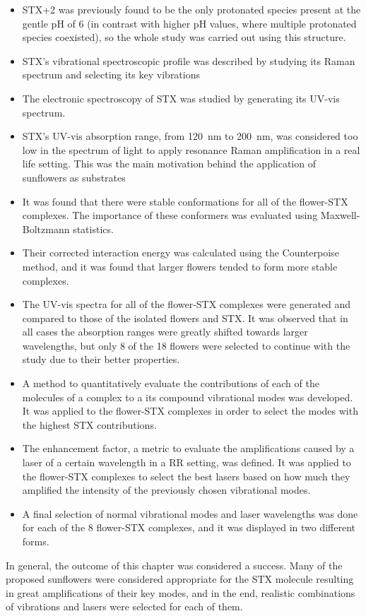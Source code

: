 \begin{itemize}
    \item STX+2 was previously found to be the only protonated species present at the gentle pH of 6 (in contrast with higher pH values, where multiple protonated species coexisted), so the whole study was carried out using this structure.
    \item STX's vibrational spectroscopic profile was described by studying its Raman spectrum and selecting its key vibrations
    \item The electronic spectroscopy of STX was studied by generating its UV-vis spectrum.
    \item STX's UV-vis absorption range, from \SI{120}{\nano\metre} to \SI{200}{\nano\metre}, was considered too low in the spectrum of light to apply resonance Raman amplification in a real life setting. This was the main motivation behind the application of sunflowers as substrates
    \item It was found that there were stable conformations for all of the flower-STX complexes. The importance of these conformers was evaluated using Maxwell-Boltzmann statistics.
    \item Their corrected interaction energy was calculated using the Counterpoise method, and it was found that larger flowers tended to form more stable complexes.
    \item The UV-vis spectra for all of the flower-STX complexes were generated and compared to those of the isolated flowers and STX. It was observed that in all cases the absorption ranges were greatly shifted towards larger wavelengths, but only 8 of the 18 flowers were selected to continue with the study due to their better properties.
    \item A method to quantitatively evaluate the contributions of each of the molecules of a complex to a its compound vibrational modes was developed. It was applied to the flower-STX complexes in order to select the modes with the highest STX contributions.
    \item The enhancement factor, a metric to evaluate the amplifications caused by a laser of a certain wavelength in a RR setting, was defined. It was applied to the flower-STX complexes to select the best lasers based on how much they amplified the intensity of the previously chosen vibrational modes.
    \item A final selection of normal vibrational modes and laser wavelengths was done for each of the 8 flower-STX complexes, and it was displayed in two different forms.
\end{itemize}

In general, the outcome of this chapter was considered a success.
Many of the proposed sunflowers were considered appropriate for the STX molecule resulting in great amplifications of their key modes, and in the end, realistic combinations of vibrations and lasers were selected for each of them.
